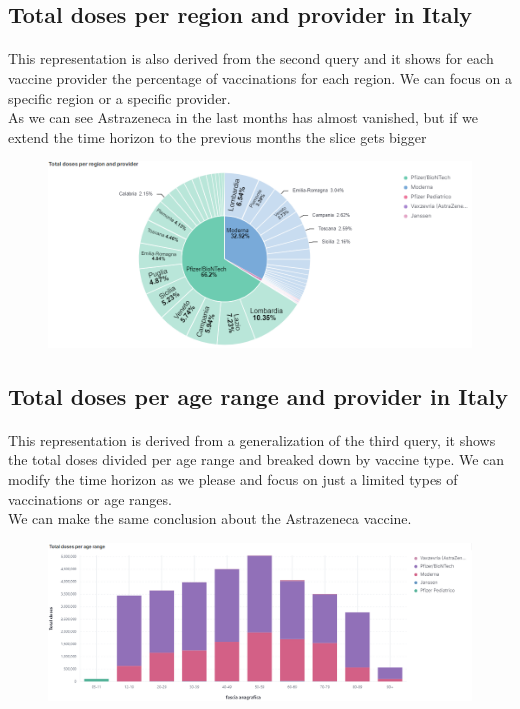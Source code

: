 \documentclass[a4paper,12pt]{article}
\begin{document}
\subsection{Total doses per region and provider in Italy}

\paragraph{}This representation is also derived from the second query and it shows for each vaccine provider the percentage of vaccinations for each region. We can focus on a specific region or a specific provider.\\
As we can see Astrazeneca in the last months has almost vanished, but if we extend the time horizon to the previous months the slice gets bigger
\begin{figure}[h]
	\centering
  \includegraphics[width=\linewidth]{dashboards/dash2.png}
\end{figure}

\subsection{Total doses per age range and provider in Italy}

\paragraph{}This representation is derived from a generalization of the third query, it shows the total doses divided per age range and breaked down by vaccine type.
We can modify the time horizon as we please and focus on just a limited types of vaccinations or age ranges.\\
We can make the same conclusion about the Astrazeneca vaccine.
\begin{figure}[h]
	\centering
  \includegraphics[width=\linewidth]{dashboards/dash3.png}
\end{figure}
\end{document}
